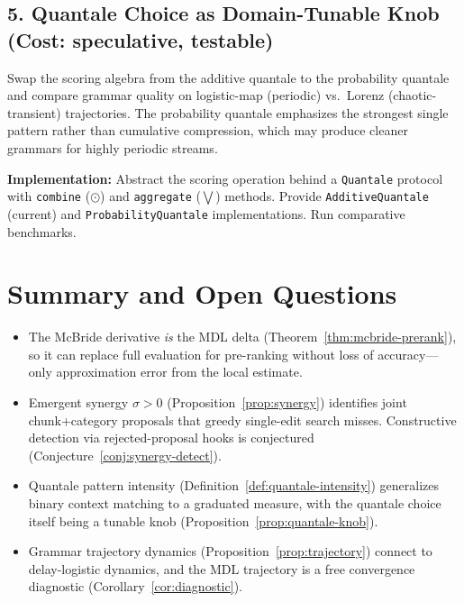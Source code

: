 \documentclass[11pt]{article}
\begin{document}
\subsection{5. Quantale Choice as Domain-Tunable Knob (Cost: speculative, testable)}

Swap the scoring algebra from the additive quantale to the probability quantale and compare grammar quality on logistic-map (periodic) vs.\ Lorenz (chaotic-transient) trajectories. The probability quantale emphasizes the strongest single pattern rather than cumulative compression, which may produce cleaner grammars for highly periodic streams.

\textbf{Implementation:} Abstract the scoring operation behind a \texttt{Quantale} protocol with \texttt{combine} ($\odot$) and \texttt{aggregate} ($\bigvee$) methods. Provide \texttt{AdditiveQuantale} (current) and \texttt{ProbabilityQuantale} implementations. Run comparative benchmarks.

\section{Summary and Open Questions}

\begin{itemize}
    \item The McBride derivative \emph{is} the MDL delta (Theorem~\ref{thm:mcbride-prerank}), so it can replace full evaluation for pre-ranking without loss of accuracy---only approximation error from the local estimate.
    \item Emergent synergy $\sigma > 0$ (Proposition~\ref{prop:synergy}) identifies joint chunk+category proposals that greedy single-edit search misses. Constructive detection via rejected-proposal hooks is conjectured (Conjecture~\ref{conj:synergy-detect}).
    \item Quantale pattern intensity (Definition~\ref{def:quantale-intensity}) generalizes binary context matching to a graduated measure, with the quantale choice itself being a tunable knob (Proposition~\ref{prop:quantale-knob}).
    \item Grammar trajectory dynamics (Proposition~\ref{prop:trajectory}) connect to delay-logistic dynamics, and the MDL trajectory is a free convergence diagnostic (Corollary~\ref{cor:diagnostic}).
\end{itemize}
\end{document}
